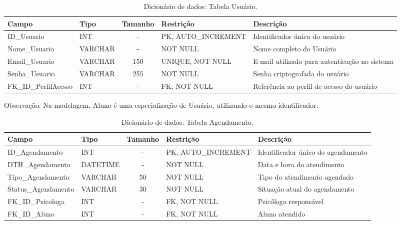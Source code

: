 \begin{table}[H]
    \centering
    \ABNTEXfontereduzida
    \caption[Dicionário de Dados - Tabela Usuário]{Dicionário de dados: Tabela Usuário.}
    \label{tab-tb-usuario}
    \begin{tabular}{p{3.5cm}|p{2cm}|c|p{3.5cm}|p{4cm}}
    \textbf{Campo} & \textbf{Tipo} & \textbf{Tamanho} & \textbf{Restrição} & \textbf{Descrição} \\
    \hline
    ID\_Usuario & INT & - & PK, AUTO\_INCREMENT & Identificador único do usuário \\
    \hline
    Nome\_Usuario & VARCHAR & - & NOT NULL & Nome completo do Usuário \\
    \hline
    Email\_Usuario & VARCHAR & 150 & UNIQUE, NOT NULL & E-mail utilizado para autenticação no sistema \\
    \hline
    Senha\_Usuario & VARCHAR & 255 & NOT NULL & Senha criptografada do usuário \\
    \hline
    FK\_ID\_PerfilAcesso & INT & - & FK, NOT NULL & Referência ao perfil de acesso do usuário \\
    \end{tabular}
\end{table}

    Observação: Na modelagem, Aluno é uma especialização de Usuário, utilizando o mesmo identificador.

\begin{table}[H]
    \centering
    \ABNTEXfontereduzida
    \caption[Dicionário de Dados - Tabela Agendamento]{Dicionário de dados: Tabela Agendamento.}
    \label{tab-tb-agendamento}
    \begin{tabular}{p{3.5cm}|p{2cm}|c|p{3.5cm}|p{4cm}}
    \textbf{Campo} & \textbf{Tipo} & \textbf{Tamanho} & \textbf{Restrição} & \textbf{Descrição} \\
    \hline
    ID\_Agendamento & INT & - & PK, AUTO\_INCREMENT & Identificador único do agendamento \\
    \hline
    DTH\_Agendamento & DATETIME & - & NOT NULL & Data e hora do atendimento \\
    \hline
    Tipo\_Agendamento & VARCHAR & 50 & NOT NULL & Tipo do atendimento agendado \\
    \hline
    Status\_Agendamento & VARCHAR & 30 & NOT NULL & Situação atual do agendamento \\
    \hline
    FK\_ID\_Psicologa & INT & - & FK, NOT NULL & Psicóloga responsável \\
    \hline
    FK\_ID\_Aluno & INT & - & FK, NOT NULL & Aluno atendido \\
    \end{tabular}
\end{table}

